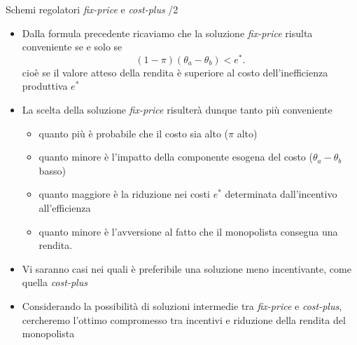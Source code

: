 \documentclass[aspectratio=64,11pt]{beamer}
\begin{document}
\begin{frame}{Schemi regolatori \emph{fix-price} e \emph{cost-plus} /2}
\begin{itemize}
\item Dalla formula precedente ricaviamo che la soluzione \emph{fix-price} risulta
conveniente se e solo se
\begin{equation*}
   (1-\pi)(\theta_a-\theta_b)<e^*.
\end{equation*}
cioè se il valore atteso della rendita è superiore al costo
dell'inefficienza produttiva $e^*$
\item La scelta della soluzione \emph{fix-price} risulterà dunque tanto più
conveniente
\begin{itemize}
\item quanto più è probabile che il costo sia alto ($\pi$ alto)
\item quanto minore è l'impatto della componente esogena del costo ($\theta_a-\theta_b$ basso)
\item quanto maggiore è la riduzione nei costi $e^*$ determinata dall'incentivo
all'efficienza
\item quanto minore è l'avversione al fatto che il monopolista consegua
una rendita.
\end{itemize}
\item Vi saranno casi nei quali è preferibile una soluzione meno incentivante,
come quella \emph{cost-plus}
\item Considerando la possibilità di soluzioni intermedie tra \emph{fix-price} e
\emph{cost-plus}, cercheremo l'ottimo compromesso tra incentivi e riduzione della
rendita del monopolista
\end{itemize}
\end{frame}
\end{document}
